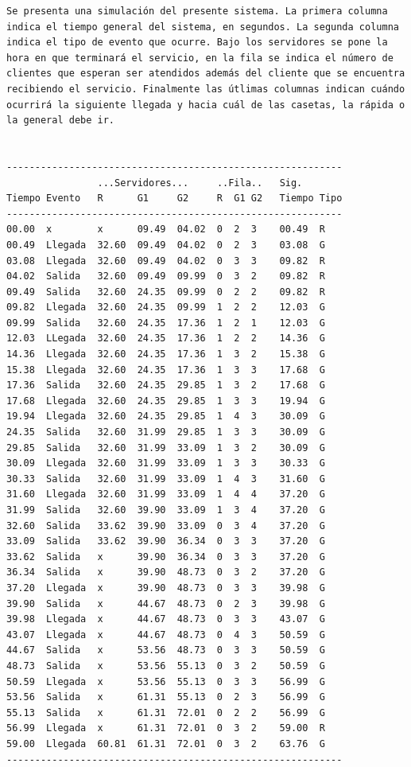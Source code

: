 \begin{verbatim}
Se presenta una simulación del presente sistema. La primera columna indica el tiempo general del sistema, en segundos. La segunda columna indica el tipo de evento que ocurre. Bajo los servidores se pone la hora en que terminará el servicio, en la fila se indica el número de clientes que esperan ser atendidos además del cliente que se encuentra recibiendo el servicio. Finalmente las útlimas columnas indican cuándo ocurrirá la siguiente llegada y hacia cuál de las casetas, la rápida o la general debe ir.


-----------------------------------------------------------
                ...Servidores...     ..Fila..   Sig.
Tiempo Evento   R      G1     G2     R  G1 G2   Tiempo Tipo
-----------------------------------------------------------
00.00  x        x      09.49  04.02  0  2  3    00.49  R
00.49  Llegada  32.60  09.49  04.02  0  2  3    03.08  G
03.08  Llegada  32.60  09.49  04.02  0  3  3    09.82  R
04.02  Salida   32.60  09.49  09.99  0  3  2    09.82  R
09.49  Salida   32.60  24.35  09.99  0  2  2    09.82  R
09.82  Llegada  32.60  24.35  09.99  1  2  2    12.03  G
09.99  Salida   32.60  24.35  17.36  1  2  1    12.03  G
12.03  LLegada  32.60  24.35  17.36  1  2  2    14.36  G
14.36  Llegada  32.60  24.35  17.36  1  3  2    15.38  G
15.38  Llegada  32.60  24.35  17.36  1  3  3    17.68  G
17.36  Salida   32.60  24.35  29.85  1  3  2    17.68  G
17.68  Llegada  32.60  24.35  29.85  1  3  3    19.94  G
19.94  Llegada  32.60  24.35  29.85  1  4  3    30.09  G
24.35  Salida   32.60  31.99  29.85  1  3  3    30.09  G
29.85  Salida   32.60  31.99  33.09  1  3  2    30.09  G
30.09  Llegada  32.60  31.99  33.09  1  3  3    30.33  G
30.33  Salida   32.60  31.99  33.09  1  4  3    31.60  G
31.60  Llegada  32.60  31.99  33.09  1  4  4    37.20  G
31.99  Salida   32.60  39.90  33.09  1  3  4    37.20  G
32.60  Salida   33.62  39.90  33.09  0  3  4    37.20  G
33.09  Salida   33.62  39.90  36.34  0  3  3    37.20  G
33.62  Salida   x      39.90  36.34  0  3  3    37.20  G
36.34  Salida   x      39.90  48.73  0  3  2    37.20  G
37.20  Llegada  x      39.90  48.73  0  3  3    39.98  G
39.90  Salida   x      44.67  48.73  0  2  3    39.98  G
39.98  Llegada  x      44.67  48.73  0  3  3    43.07  G
43.07  Llegada  x      44.67  48.73  0  4  3    50.59  G
44.67  Salida   x      53.56  48.73  0  3  3    50.59  G
48.73  Salida   x      53.56  55.13  0  3  2    50.59  G
50.59  Llegada  x      53.56  55.13  0  3  3    56.99  G
53.56  Salida   x      61.31  55.13  0  2  3    56.99  G
55.13  Salida   x      61.31  72.01  0  2  2    56.99  G
56.99  Llegada  x      61.31  72.01  0  3  2    59.00  R
59.00  Llegada  60.81  61.31  72.01  0  3  2    63.76  G
-----------------------------------------------------------




\end{verbatim}
